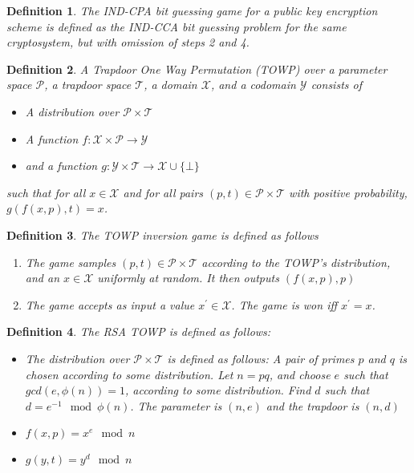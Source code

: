 \documentclass[a4paper,german]{article}
\newtheorem{definition}{Definition}
\begin{document}
\begin{definition}
	The IND-CPA bit guessing game for a public key encryption scheme is defined as the IND-CCA bit guessing problem for the same cryptosystem, but with omission of steps 2 and 4.
\end{definition}

\begin{definition}
	A Trapdoor One Way Permutation (TOWP) over a parameter space $\mathcal{P}$, a trapdoor space $\mathcal{T}$, a domain $\mathcal{X}$, and a codomain $\mathcal{Y}$ consists of

	\begin{itemize}
	
		\item  A distribution over $\mathcal{P \times T}$ 
		\item  A function $f: \mathcal{X \times P} \rightarrow \mathcal{Y}$ 
		\item  and a function $g: \mathcal{Y \times T} \rightarrow \mathcal{X} \cup \{\bot\}$
	\end{itemize}
	such that for all $x \in \mathcal{X}$ and for all pairs $(p, t) \in \mathcal{P \times T}$ with positive probability, $g(f(x, p), t) = x$.
\end{definition}

\begin{definition}
	The TOWP inversion game is defined as follows

	\begin{enumerate}
	
		\item  The game samples $(p, t) \in \mathcal{P \times T}$ according to the TOWP's distribution, and an $x \in \mathcal{X}$ uniformly at random. It then outputs $(f(x, p), p)$
		\item  The game accepts as input a value $x^\prime \in \mathcal{X}$. The game is won iff $x^\prime = x$.
	
	\end{enumerate}
\end{definition}

\begin{definition}
	The RSA TOWP is defined as follows:

	\begin{itemize}
	
		\item  The distribution over $\mathcal{P \times T}$ is defined as follows:
			A pair of primes $p$ and $q$ is chosen according to some distribution. Let $n = pq$, and choose $e$ such that $gcd(e, \phi(n))=1$, according to some distribution. Find $d$ such that $d = e^{-1} \mod \phi(n)$. The parameter is  $(n, e)$ and the trapdoor is $(n, d)$ 
		\item  $f(x, p) = x^e \mod n$
		\item  $g(y, t) = y^d \mod n$
	
	\end{itemize}
\end{definition}
\end{document}
